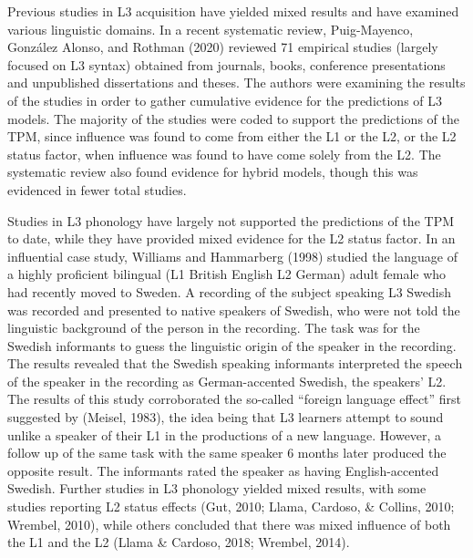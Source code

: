 \documentclass[
  english,
  man]{apa6}
\begin{document}
Previous studies in L3 acquisition have yielded mixed results and have examined various linguistic domains.
In a recent systematic review, Puig-Mayenco, González Alonso, and Rothman (2020) reviewed 71 empirical studies (largely focused on L3 syntax) obtained from journals, books, conference presentations and unpublished dissertations and theses.
The authors were examining the results of the studies in order to gather cumulative evidence for the predictions of L3 models.
The majority of the studies were coded to support the predictions of the TPM, since influence was found to come from either the L1 or the L2, or the L2 status factor, when influence was found to have come solely from the L2. The systematic review also found evidence for hybrid models, though this was evidenced in fewer total studies.

Studies in L3 phonology have largely not supported the predictions of the TPM to date, while they have provided mixed evidence for the L2 status factor.
In an influential case study, Williams and Hammarberg (1998) studied the language of a highly proficient bilingual (L1 British English L2 German) adult female who had recently moved to Sweden.
A recording of the subject speaking L3 Swedish was recorded and presented to native speakers of Swedish, who were not told the linguistic background of the person in the recording.
The task was for the Swedish informants to guess the linguistic origin of the speaker in the recording. The results revealed that the Swedish speaking informants interpreted the speech of the speaker in the recording as German-accented Swedish, the speakers' L2.
The results of this study corroborated the so-called ``foreign language effect'' first suggested by (Meisel, 1983), the idea being that L3 learners attempt to sound unlike a speaker of their L1 in the productions of a new language.
However, a follow up of the same task with the same speaker 6 months later produced the opposite result.
The informants rated the speaker as having English-accented Swedish. Further studies in L3 phonology yielded mixed results, with some studies reporting L2 status effects (Gut, 2010; Llama, Cardoso, \& Collins, 2010; Wrembel, 2010), while others concluded that there was mixed influence of both the L1 and the L2 (Llama \& Cardoso, 2018; Wrembel, 2014).
\end{document}
